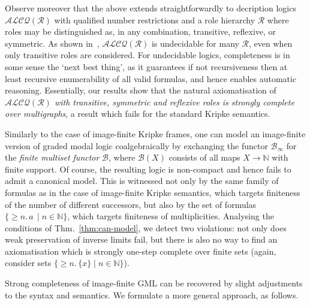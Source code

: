 \documentclass[proceedings]{stacs}
\theoremstyle{definition}
\theoremstyle{plain}
\newcommand{\Nat}{{\mathbb{N}}}
\newcommand{\Bag}{\mathcal{B}}
\newcommand{\Baginfty}{\mathcal{B}_\infty}
\DeclareMathOperator{\mge}{\ge}
\newcommand{\RBox}{\mathcal{R}}
\newcommand{\ALCQ}{\mathcal{ALCQ}}
\begin{document}
\begin{exa}
Observe moreover that the above extends straightforwardly to
decription logics $\ALCQ(\RBox)$ with qualified number restrictions
and a role hierarchy $\RBox$ where roles may be distinguished as, in
any combination, transitive, reflexive, or symmetric. As shown
in~\cite{HorrocksEA99,KazakovEA07}, $\ALCQ(\RBox)$ is undecidable for
many $\RBox$, even when only transitive roles are considered. For
undecidable logics, completeness is in some sense the `next best
thing', as it guarantees if not recursiveness then at least recursive
enumerability of all valid formulas, and hence enables automatic
reasoning. Essentially, our results show that the natural
axiomatisation of \emph{$\ALCQ(\RBox)$ with transitive, symmetric and
  reflexive roles is strongly complete over multigraphs}, a result
which fails for the standard Kripke semantics.
\end{exa}





\begin{exa}
\label{expl:gml-finite}
Similarly to the case of image-finite Kripke frames, one can model an
image-finite version of graded modal logic coalgebraically by
exchanging the functor $\Baginfty$ for the \emph{finite multiset
  functor} $\Bag$, where $\Bag(X)$ consists of all maps $X\to\Nat$
with finite support. Of course, the resulting logic is non-compact and
hence fails to admit a canonical model. This is witnessed not only by
the same family of formulas as in the case of image-finite Kripke
semantics, which targets finiteness of the number of different
successors, but also by the set of formulas $\{\mge n.\,a\,\mid
n\in\Nat\}$, which targets finiteness of multiplicities. Analysing the
conditions of Thm.~\ref{thm:can-model}, we detect two violations: not
only does weak preservation of inverse limits fail, but there is also
no way to find an axiomatisation which is strongly one-step complete
over finite sets (again, consider sets $\{\mge n.\,\{x\}\mid
n\in\Nat\}$).
\end{exa}

\noindent Strong completeness of image-finite GML can be recovered by
slight adjustments to the syntax and semantics. We formulate a more
general approach, as follows.
\end{document}
